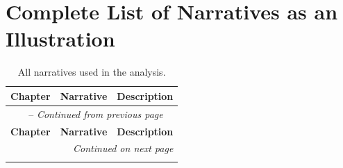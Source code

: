 \documentclass[
  journal=medium,
  manuscript=article-type,
  year=2025,
  volume=1,
]{cup-journal}
\begin{document}
\printbibliography

\appendix

\section{Complete List of Narratives as an Illustration}
\label{app:narratives_illustration}

\begin{longtable}{p{2cm}p{4cm}p{7cm}}
\caption{All narratives used in the analysis.}
\label{tab:narratives}\\
\toprule
\textbf{Chapter} & \textbf{Narrative} & \textbf{Description} \\
\midrule
\endfirsthead

\multicolumn{3}{c}{\tablename\ \thetable{} -- \textit{Continued from previous page}} \\
\toprule
\textbf{Chapter} & \textbf{Narrative} & \textbf{Description} \\
\midrule
\endhead

\midrule
\multicolumn{3}{r}{\textit{Continued on next page}} \\
\endfoot

\bottomrule
\endlastfoot


\end{longtable}
\end{document}
